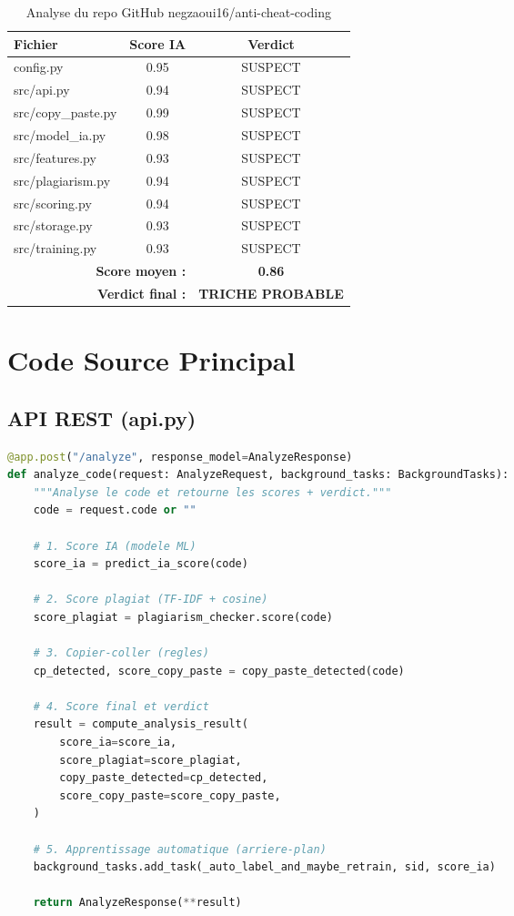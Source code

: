 \documentclass[12pt,a4paper]{report}
\begin{document}
\begin{table}[H]
\centering
\renewcommand{\arraystretch}{1.3}
\begin{tabular}{l c c}
\toprule
\textbf{Fichier} & \textbf{Score IA} & \textbf{Verdict} \\
\midrule
config.py & 0.95 & SUSPECT \\
src/api.py & 0.94 & SUSPECT \\
src/copy\_paste.py & 0.99 & SUSPECT \\
src/model\_ia.py & 0.98 & SUSPECT \\
src/features.py & 0.93 & SUSPECT \\
src/plagiarism.py & 0.94 & SUSPECT \\
src/scoring.py & 0.94 & SUSPECT \\
src/storage.py & 0.93 & SUSPECT \\
src/training.py & 0.93 & SUSPECT \\
\midrule
\multicolumn{2}{r}{\textbf{Score moyen :}} & \textbf{0.86} \\
\multicolumn{2}{r}{\textbf{Verdict final :}} & \textcolor{dangerred}{\textbf{TRICHE PROBABLE}} \\
\bottomrule
\end{tabular}
\caption{Analyse du repo GitHub negzaoui16/anti-cheat-coding}
\end{table}

\chapter{Code Source Principal}

\section{API REST (api.py)}

\begin{lstlisting}[language=python, caption=Extrait de src/api.py]
@app.post("/analyze", response_model=AnalyzeResponse)
def analyze_code(request: AnalyzeRequest, background_tasks: BackgroundTasks):
    """Analyse le code et retourne les scores + verdict."""
    code = request.code or ""
    
    # 1. Score IA (modele ML)
    score_ia = predict_ia_score(code)
    
    # 2. Score plagiat (TF-IDF + cosine)
    score_plagiat = plagiarism_checker.score(code)
    
    # 3. Copier-coller (regles)
    cp_detected, score_copy_paste = copy_paste_detected(code)
    
    # 4. Score final et verdict
    result = compute_analysis_result(
        score_ia=score_ia,
        score_plagiat=score_plagiat,
        copy_paste_detected=cp_detected,
        score_copy_paste=score_copy_paste,
    )
    
    # 5. Apprentissage automatique (arriere-plan)
    background_tasks.add_task(_auto_label_and_maybe_retrain, sid, score_ia)
    
    return AnalyzeResponse(**result)
\end{lstlisting}
\end{document}
